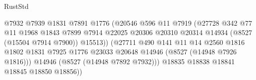 \begin{lexlean}{RustStd}
\begin{coremodule}
                                              @7932
                                              @7939
                                              @1831
                                              @7891
                                              @1776
                                              (@20546
                                                @596
                                                @11
                                                @7919
                                                (@27728
                                                  @342
                                                  @77
                                                  @11
                                                  @1968
                                                  @1843
                                                  @7899
                                                  @7914
                                                  @22025
                                                  @20306
                                                  @20310
                                                  @20314
                                                  @14934
                                                  (@8527 (@15504 @7914 @7900))
                                                  @15513))
                                              (@27711
                                                @490
                                                @141
                                                @11
                                                @14
                                                @2560
                                                @1816
                                                @1802
                                                @1831
                                                @7925
                                                @1776
                                                @23033
                                                @20648
                                                @14946
                                                (@8527 (@14948 @7926 @1816)))
                                              @14946
                                              (@8527 (@14948 @7892 @7932)))
                                            @18835
                                            @18838
                                            @18841
                                            @18845
                                            @18850
                                            @18856))

\end{coremodule}
\end{lexlean}

